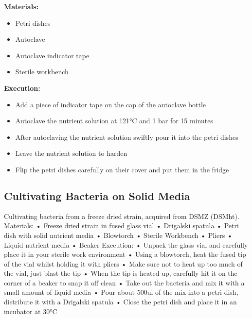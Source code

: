 \textbf{Materials:}

\begin{itemize}
    \item Petri dishes
    \item Autoclave
    \item Autoclave indicator tape
    \item Sterile workbench
\end{itemize}


\textbf{Execution:}

\begin{itemize}
    \item Add a piece of indicator tape on the cap of the autoclave bottle
    \item Autoclave the nutrient solution at 121°C and 1 bar for 15 minutes
    \item After autoclaving the nutrient solution swiftly pour it into the petri dishes
    \item Leave the nutrient solution to harden
    \item Flip the petri dishes carefully on their cover and put them in the fridge
\end{itemize}

\subsection{Cultivating Bacteria on Solid Media}

Cultivating bacteria from a freeze dried strain, acquired from DSMZ (DSMht).
Materials:
• Freeze dried strain in fused glass vial
• Drigalski spatula
• Petri dish with solid nutrient media
• Blowtorch
• Sterile Workbench
• Pliers
• Liquid nutrient media
• Beaker
Execution:
• Unpack the glass vial and carefully place it in your sterile work environment
• Using a blowtorch, heat the fused tip of the vial whilst holding it with pliers
• Make sure not to heat up too much of the vial, just blast the tip
• When the tip is heated up, carefully hit it on the corner of a beaker to snap it
off clean
• Take out the bacteria and mix it with a small amount of liquid media
• Pour about 500ul of the mix into a petri dish, distribute it with a Drigalski
spatula
• Close the petri dish and place it in an incubator at 30°C

